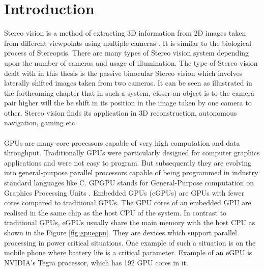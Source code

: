 \chapter{Introduction}
\label{chap:introduction}

Stereo vision is a method of extracting 3D information from 2D images taken from different viewpoints using multiple cameras \cite{young_ki_baik_fast_2006}. It is similar to the biological process of Stereopsis. There are many types of Stereo vision system depending upon the number of cameras and usage of illumination. The type of Stereo vision dealt with in this thesis is the passive binocular Stereo vision which involves laterally shifted images taken from two cameras. It can be seen as illustrated in the forthcoming chapter that in such a system, closer an object is to the camera pair higher will the be shift in its position in the image taken by one camera to other. Stereo vision finds its application in 3D reconstruction, autonomous navigation, gaming etc.\\
\\
GPUs are many-core processors capable of very high computation and data throughput. Traditionally GPUs were particularly designed for computer graphics applications and were not easy to program. But subsequently they are evolving into general-purpose parallel processors capable of being programmed in industry standard languages like C. GPGPU stands for General-Purpose computation on Graphics Processing Units \cite{harris_about}. Embedded GPUs (eGPUs) are GPUs with fewer cores compared to traditional GPUs. The GPU cores of an embedded GPU are realised in the same chip as the host CPU of the system. In contrast to traditional GPUs, eGPUs usually share the main memory with the host CPU as shown in the Figure \ref{fig:gpuegpu}. They are devices which support parallel processing in power critical situations. One example of such a situation is on the mobile phone where battery life is a critical parameter. Example of an eGPU is NVIDIA's Tegra processor, which has 192 GPU cores in it.\\

